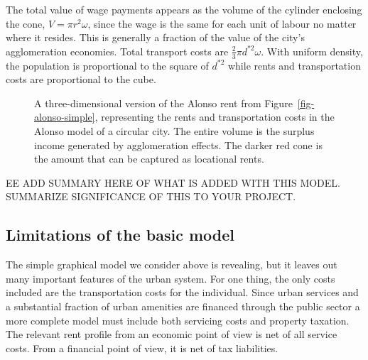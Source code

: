 The total value of wage payments appears as the volume of the cylinder enclosing the cone, $V=\pi r^2 \omega$, since the wage is the same for each unit of labour no matter where it resides. This is generally a fraction of the value of the city's agglomeration economies. 
Total transport costs are $\frac{2}{3}\pi  d^{*2} \omega$. 
With uniform density, the population is proportional to the square of  $d^{*2}$ while rents and transportation costs are proportional to the cube. %


\begin{figure}
    \begin{center}
    
    \caption[A three-dimensional version of the Alonso model.]{A three-dimensional version of the Alonso rent from Figure~\ref{fig-alonso-simple}, representing the rents and transportation costs in the Alonso model of a circular city. The entire volume is the surplus income generated by agglomeration effects. The darker red cone is the amount that can be captured as locational rents.}
    \label{fig-city-conical}
    \end{center}
\end{figure}



EE ADD SUMMARY HERE OF WHAT IS ADDED WITH THIS MODEL. SUMMARIZE SIGNIFICANCE OF THIS TO YOUR PROJECT. 

 
\subsection{Limitations of the basic model}
The simple graphical model we consider above is revealing, but it leaves out many important features of the urban system. For one thing, the only costs included are the transportation costs for the individual.  Since urban services and  a substantial fraction of urban amenities are financed through the public sector a more complete model must include both servicing costs and property taxation. The relevant rent profile from an economic point of view is net of all service costs. From a financial point of view, it is net of tax liabilities.%

